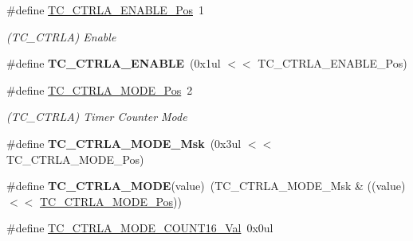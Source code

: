 \begin{DoxyCompactItemize}
\item 
\hypertarget{group___s_a_m_l21___t_c_ga1f1f50da3e9afaa40a155ad5410adc65}{}\#define \hyperlink{group___s_a_m_l21___t_c_ga1f1f50da3e9afaa40a155ad5410adc65}{T\+C\+\_\+\+C\+T\+R\+L\+A\+\_\+\+E\+N\+A\+B\+L\+E\+\_\+\+Pos}~1\label{group___s_a_m_l21___t_c_ga1f1f50da3e9afaa40a155ad5410adc65}

\begin{DoxyCompactList}\small\item\em (T\+C\+\_\+\+C\+T\+R\+L\+A) Enable \end{DoxyCompactList}\item 
\hypertarget{group___s_a_m_l21___t_c_ga4c7d988416a5d9104340256cb66d3200}{}\#define {\bfseries T\+C\+\_\+\+C\+T\+R\+L\+A\+\_\+\+E\+N\+A\+B\+L\+E}~(0x1ul $<$$<$ T\+C\+\_\+\+C\+T\+R\+L\+A\+\_\+\+E\+N\+A\+B\+L\+E\+\_\+\+Pos)\label{group___s_a_m_l21___t_c_ga4c7d988416a5d9104340256cb66d3200}

\item 
\hypertarget{group___s_a_m_l21___t_c_gaae33620c144befdc20a57898c2d5bb96}{}\#define \hyperlink{group___s_a_m_l21___t_c_gaae33620c144befdc20a57898c2d5bb96}{T\+C\+\_\+\+C\+T\+R\+L\+A\+\_\+\+M\+O\+D\+E\+\_\+\+Pos}~2\label{group___s_a_m_l21___t_c_gaae33620c144befdc20a57898c2d5bb96}

\begin{DoxyCompactList}\small\item\em (T\+C\+\_\+\+C\+T\+R\+L\+A) Timer Counter Mode \end{DoxyCompactList}\item 
\hypertarget{group___s_a_m_l21___t_c_gaf39aa4438c72db51e8c8e34ba956bc33}{}\#define {\bfseries T\+C\+\_\+\+C\+T\+R\+L\+A\+\_\+\+M\+O\+D\+E\+\_\+\+Msk}~(0x3ul $<$$<$ T\+C\+\_\+\+C\+T\+R\+L\+A\+\_\+\+M\+O\+D\+E\+\_\+\+Pos)\label{group___s_a_m_l21___t_c_gaf39aa4438c72db51e8c8e34ba956bc33}

\item 
\hypertarget{group___s_a_m_l21___t_c_ga9e55767686ff9ec233d03f26643a5fd3}{}\#define {\bfseries T\+C\+\_\+\+C\+T\+R\+L\+A\+\_\+\+M\+O\+D\+E}(value)~(T\+C\+\_\+\+C\+T\+R\+L\+A\+\_\+\+M\+O\+D\+E\+\_\+\+Msk \& ((value) $<$$<$ \hyperlink{group___s_a_m_l21___t_c_gaae33620c144befdc20a57898c2d5bb96}{T\+C\+\_\+\+C\+T\+R\+L\+A\+\_\+\+M\+O\+D\+E\+\_\+\+Pos}))\label{group___s_a_m_l21___t_c_ga9e55767686ff9ec233d03f26643a5fd3}

\item 
\hypertarget{group___s_a_m_l21___t_c_gacf36c4f8dfa9af8b7d0b8103ded6df59}{}\#define \hyperlink{group___s_a_m_l21___t_c_gacf36c4f8dfa9af8b7d0b8103ded6df59}{T\+C\+\_\+\+C\+T\+R\+L\+A\+\_\+\+M\+O\+D\+E\+\_\+\+C\+O\+U\+N\+T16\+\_\+\+Val}~0x0ul\label{group___s_a_m_l21___t_c_gacf36c4f8dfa9af8b7d0b8103ded6df59}


\end{DoxyCompactItemize}
